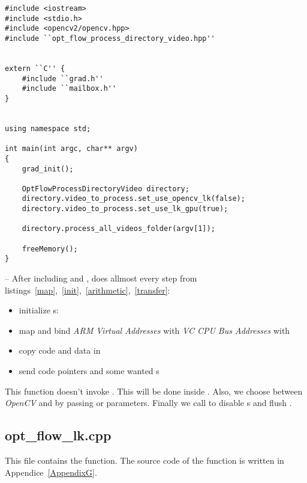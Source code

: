 \begin{lstlisting}
#include <iostream>
#include <stdio.h>
#include <opencv2/opencv.hpp>
#include ``opt_flow_process_directory_video.hpp''


extern ``C'' {
	#include ``grad.h''
	#include ``mailbox.h''
}


using namespace std;

int main(int argc, char** argv)
{
	grad_init();

	OptFlowProcessDirectoryVideo directory;
	directory.video_to_process.set_use_opencv_lk(false);
	directory.video_to_process.set_use_lk_gpu(true);

	directory.process_all_videos_folder(argv[1]);

	freeMemory();
}
\end{lstlisting}

-- After including  and ,  does allmost every step from listings~\ref{map},~\ref{init},~\ref{arithmetic},~\ref{transfer}:
\begin{itemize}
	\item initialize \qpu{}s: 
	\item map \ram{} and bind \emph{ARM Virtual Addresses} with \emph{VC CPU Bus Addresses} with 
	\item copy code and data in \ram
	\item send code pointers and some wanted \uni{}s
\end{itemize}

This function doesn't invoke . This will be done inside . Also, we choose between \emph{OpenCV} and  by passing  or  parameters. Finally we call  to disable \qpu{}s and flush \ram.


\subsection{opt\_flow\_lk.cpp}

This file contains the  function. The source code of the function is written in Appendice~\ref{AppendixG}.

